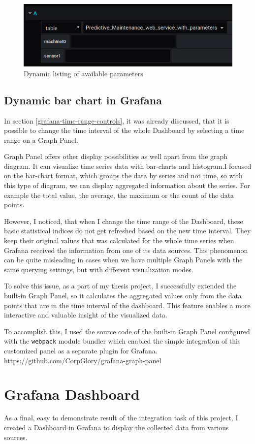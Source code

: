 \begin{figure}[h]
	\centering
	\includegraphics[width=130mm, keepaspectratio]{figures/dynamic-parameters.png}
	\caption{Dynamic listing of available parameters}
	\label{fig:dynamic-parameters}
\end{figure}

\subsection{Dynamic bar chart in Grafana}

In section \ref{grafana-time-range-controls}, it was already discussed, that it is possible to change the time interval of the whole Dashboard by selecting a time range on a Graph Panel.

Graph Panel offers other display possibilities as well apart from the graph diagram. It can visualize time series data with bar-charts and histogram.I focused on the bar-chart format, which groups the data by series and not time, so with this type of diagram, we can display aggregated information about the series. For example the total value, the average, the maximum or the count of the data points.

However, I noticed, that when I change the time range of the Dashboard, these basic statistical indices do not get refreshed based on the new time interval. They keep their original values that was calculated for the whole time series when Grafana received the information from one of its data sources. This phenomenon can be quite misleading in cases when we have multiple Graph Panels with the same querying settings, but with different visualization modes.

To solve this issue, as a part of my thesis project, I successfully extended the built-in Graph Panel, so it calculates the aggregated values only from the data points that are in the time interval of the dashboard. This feature enables a more interactive and valuable insight of the visualized data.

To accomplish this, I used the source code of the built-in Graph Panel configured with the \texttt{webpack} module bundler which enabled the simple integration of this customized panel as a separate plugin for Grafana. https://github.com/CorpGlory/grafana-graph-panel

\section{Grafana Dashboard}

As a final, easy to demonstrate result of the integration task of this project, I created a Dashboard in Grafana to display the collected data from various sources.